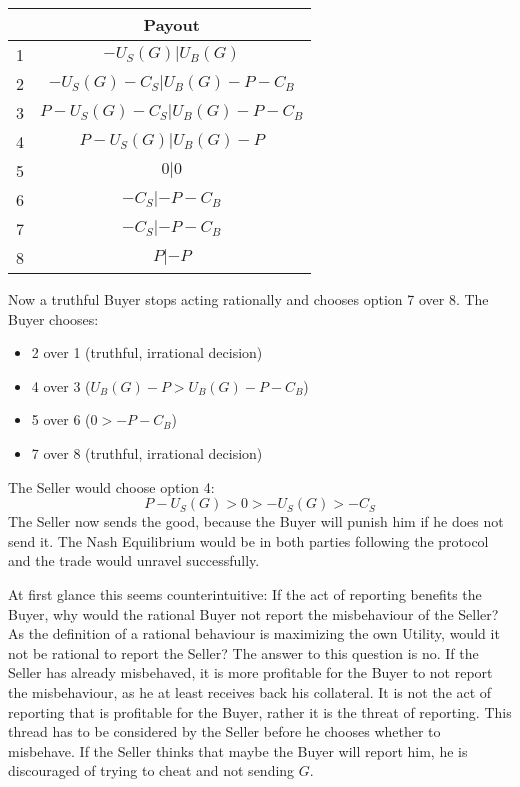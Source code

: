 \documentclass{cacthesis}
\begin{document}
\begin{center}
\begin{tabular}{ |c|c| }
\hline
& Payout  \\
\hline
\hline
1& $-U_S(G) | U_B(G)$\\
\hline
2& $-U_S(G) - C_S| U_B(G)- P - C_B $\\
\hline
3&$P-U_S(G) - C_S | U_B(G) -P - C_B$ \\
\hline
4& $P-U_S(G)| U_B(G)-P$\\
\hline
5& $0|0$\\
\hline 
6& $-C_S |-P - C_B$\\
\hline
7& $- C_S| -P-C_B$\\
\hline
8& $P| -P$\\
\hline
\end{tabular}
\end{center}
Now a truthful Buyer stops acting rationally and chooses option 7 over 8.\newline
The Buyer chooses:
\begin{itemize}
    \item 2 over 1 (truthful, irrational decision)
    \item 4 over 3 ($U_B(G) - P > U_B(G) -P -C_B$)
    \item 5 over 6 ($0 > -P -C_B$)
    \item 7 over 8 (truthful, irrational decision)
\end{itemize}
The Seller would choose option 4:
\[P-U_S(G)>0>-U_S(G)>-C_S\]
The Seller now sends the good, because the Buyer will punish him if he does not send it.
The Nash Equilibrium would be in both parties following the protocol and the trade would unravel successfully.\newline

At first glance this seems counterintuitive: If the act of reporting benefits the Buyer, why would the rational Buyer not report the misbehaviour of the Seller? As the definition of a rational behaviour is maximizing the own Utility, would it not be rational to report the Seller?
The answer to this question is no. If the Seller has already misbehaved, it is more profitable for the Buyer to not report the misbehaviour, as he at least receives back his collateral.
It is not the act of reporting that is profitable for the Buyer, rather it is
the threat of reporting. This thread has to be considered by the Seller before he chooses whether to misbehave. If the Seller thinks that maybe the Buyer will report him, he is discouraged of trying to cheat and not sending $G$.\newline
\end{document}
